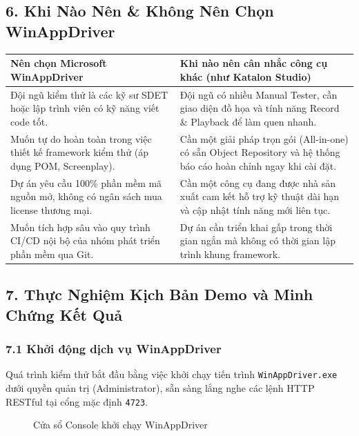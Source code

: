 \subsection{6. Khi Nào Nên \& Không Nên Chọn WinAppDriver}

\begin{table}[H]
\centering
\begin{tabular}{|l|l|}
\hline
\textbf{Nên chọn Microsoft WinAppDriver} & \textbf{Khi nào nên cân nhắc công cụ khác (như Katalon Studio)} \\ \hline
Đội ngũ kiểm thử là các kỹ sư SDET hoặc lập trình viên có kỹ năng viết code tốt. & Đội ngũ có nhiều Manual Tester, cần giao diện đồ họa và tính năng Record \& Playback để làm quen nhanh. \\ \hline
Muốn tự do hoàn toàn trong việc thiết kế framework kiểm thử (áp dụng POM, Screenplay). & Cần một giải pháp trọn gói (All-in-one) có sẵn Object Repository và hệ thống báo cáo hoàn chỉnh ngay khi cài đặt. \\ \hline
Dự án yêu cầu 100\% phần mềm mã nguồn mở, không có ngân sách mua license thương mại. & Cần một công cụ đang được nhà sản xuất cam kết hỗ trợ kỹ thuật dài hạn và cập nhật tính năng mới liên tục. \\ \hline
Muốn tích hợp sâu vào quy trình CI/CD nội bộ của nhóm phát triển phần mềm qua Git. & Dự án cần triển khai gấp trong thời gian ngắn mà không có thời gian lập trình khung framework. \\ \hline
\end{tabular}
\end{table}




\subsection{7. Thực Nghiệm Kịch Bản Demo và Minh Chứng Kết Quả}

\subsubsection{7.1 Khởi động dịch vụ WinAppDriver}
Quá trình kiểm thử bắt đầu bằng việc khởi chạy tiến trình \texttt{WinAppDriver.exe} dưới quyền quản trị (Administrator), sẵn sàng lắng nghe các lệnh HTTP RESTful tại cổng mặc định \texttt{4723}.

\begin{figure}[H]
\centering
\caption{Cửa sổ Console khởi chạy WinAppDriver}
\end{figure}


